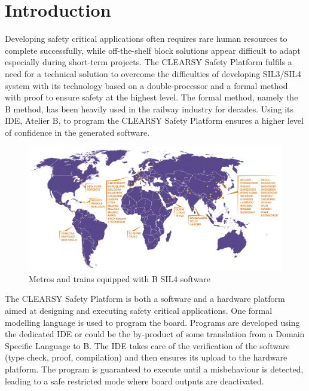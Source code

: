 \chapter{Introduction}

Developing safety critical applications often requires rare human resources to complete successfully, while off-the-shelf block solutions appear difficult to adapt especially during short-term projects. The CLEARSY Safety Platform fulfils a need for a technical solution to overcome the difficulties of developing SIL3/SIL4 system with its technology based on a double-processor and a formal method with proof to ensure safety at the highest level\cite{lecomte2016double}. The formal method, namely the B method\cite{Abrial.1996}, has been heavily used in the railway industry for decades\cite{DBLP:conf/fmics/Lecomte09}\cite{DBLP:conf/fm/Lecomte08}\cite{DBLP:journals/entcs/Benveniste11}. Using its IDE, Atelier B, to program the CLEARSY Safety Platform ensures a higher level of confidence in the generated software.\\

\begin{figure}[h]
\centering\includegraphics[scale=0.5]{Pictures/INTRO-AtelierB.jpg}
\caption{Metros and trains equipped with B SIL4 software}
\end{figure}

The CLEARSY Safety Platform is both a software and a hardware platform aimed at designing and executing safety critical applications. One formal modelling language is used to program the board. Programs are developed using the dedicated IDE or could be the by-product of some translation from a Domain Specific Language to B. The IDE takes care of the verification of the software (type check, proof, compilation) and then ensures its upload to the hardware platform. The program is guaranteed to execute until a misbehaviour is detected, leading to a safe restricted mode where board outputs are deactivated.\\

